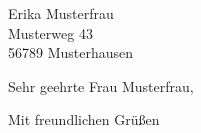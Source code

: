 \documentclass[
    a4paper,
    parskip          = half,            %
    fontsize         = 12pt,            %
    foldmarks        = true,            %
    fromalign        = right,           %
    fromrule         = afteraddress,    %
    fromphone,                          %
    fromemail,                          %
    fromlogo,                           %
    firstfoot        = off,             %
    enlargefirstpage = on,              %
    version          = last
]{scrlttr2}
\begin{document}
   	\begin{letter}{%
            Erika Musterfrau\\
            Musterweg 43\\
            56789 Musterhausen%
        }
        
        \opening{Sehr geehrte Frau Musterfrau,}
        
        \blindtext
        
        \closing{Mit freundlichen Grüßen}
        


    \end{letter}
\end{document}
